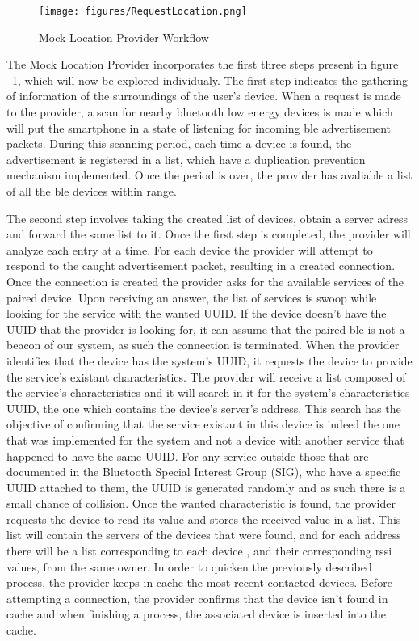 \documentclass[a4paper]{IEEEtran}
\begin{document}
\begin{figure}
	\centering
		\texttt{[image: figures/RequestLocation.png]}
	\caption[Mock Location Provider Workflow]{Mock Location Provider Workflow}
	\label{fig:MockProvider}
\end{figure}

The Mock Location Provider incorporates the first three steps present in figure ~\ref{fig:MockProvider}, which will now be explored individualy. The first step indicates the gathering of information of the surroundings of the user's device. When a request is made to the provider, a scan for nearby bluetooth low energy devices is made which will put the smartphone in a state of listening for incoming ble advertisement packets. During this scanning period, each time a device is found, the advertisement is registered in a list, which have a duplication prevention mechanism implemented. Once the period is over, the provider has avaliable a list of all the ble devices within range.   

The second step involves taking the created list of devices, obtain a server adress and forward the same list to it. Once the first step is completed, the provider will analyze each entry at a time. For each device the provider will attempt to respond to the caught advertisement packet, resulting in a created connection.  Once the connection is created the provider asks for the available services of the paired device. Upon receiving an answer, the list of services is swoop while looking for the service with the wanted UUID. If the device doesn't have the UUID that the provider is looking for, it can assume that the paired ble is not a beacon of our system, as such the connection is terminated. When the provider identifies that the device has the system's UUID, it requests the device to provide the service's existant characteristics. The provider will receive a list composed of the service's characteristics and it will search in it for the system's characteristics UUID, the one which contains the device's server's address. This search has the objective of confirming that the service existant in this device is indeed the one that was implemented for the system and not a device with another service that happened to have the same UUID. For any service outside those that are documented in the Bluetooth Special Interest Group (SIG), who have a specific UUID attached to them, the UUID is generated randomly and as such there is a small chance of collision. Once the wanted characteristic is found, the provider requests the device to read its value and stores the received value in a list. This list will contain the servers of the devices that were found, and for each address there will be a list corresponding to each device , and their corresponding rssi values, from the same owner. In order to quicken the previously described process, the provider keeps in cache the most recent contacted devices. Before attempting a connection, the provider confirms that the device isn't found in cache and when finishing a process, the associated device is inserted into the cache.
\end{document}
